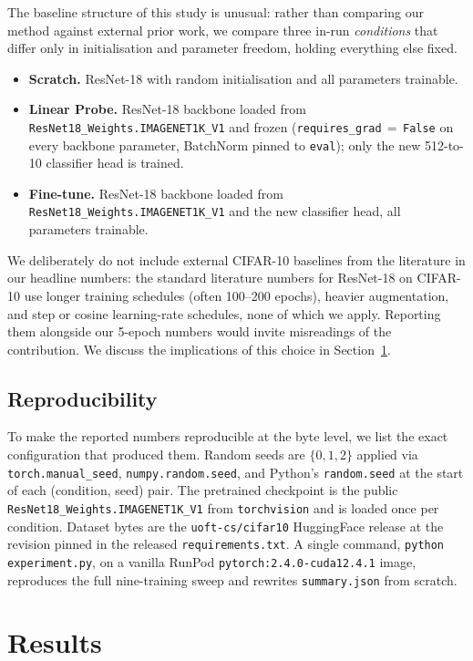 \documentclass[11pt,twocolumn]{article}
\begin{document}
The baseline structure of this study is unusual: rather than
comparing our method against external prior work, we compare three
in-run \emph{conditions} that differ only in initialisation and
parameter freedom, holding everything else fixed.
%
\begin{itemize}
  \item \textbf{Scratch.} ResNet-18 with random initialisation and
    all parameters trainable.
  \item \textbf{Linear Probe.} ResNet-18 backbone loaded from
    \texttt{ResNet18\_Weights.IMAGENET1K\_V1} and frozen
    (\texttt{requires\_grad}\,$=$\,\texttt{False} on every backbone
    parameter, BatchNorm pinned to \texttt{eval}); only the new
    512-to-10 classifier head is trained.
  \item \textbf{Fine-tune.} ResNet-18 backbone loaded from
    \texttt{ResNet18\_Weights.IMAGENET1K\_V1} and the new classifier
    head, all parameters trainable.
\end{itemize}
%
We deliberately do not include external CIFAR-10 baselines from the
literature in our headline numbers: the standard literature numbers
for ResNet-18 on CIFAR-10 use longer training schedules (often
100--200 epochs), heavier augmentation, and step or cosine
learning-rate schedules, none of which we apply. Reporting them
alongside our 5-epoch numbers would invite misreadings of the
contribution. We discuss the implications of this choice in
Section~\ref{sec:results}.


\subsection{Reproducibility}

To make the reported numbers reproducible at the byte level, we list
the exact configuration that produced them. Random seeds are
$\{0, 1, 2\}$ applied via \texttt{torch.manual\_seed}, \texttt{numpy.random.seed},
and Python's \texttt{random.seed} at the start of each (condition, seed)
pair. The pretrained checkpoint is the public
\texttt{ResNet18\_Weights.IMAGENET1K\_V1} from \texttt{torchvision} and is
loaded once per condition. Dataset bytes are the
\texttt{uoft-cs/cifar10} HuggingFace release at the revision pinned in
the released \texttt{requirements.txt}. A single command,
\texttt{python experiment.py}, on a vanilla RunPod \texttt{pytorch:2.4.0-cuda12.4.1}
image, reproduces the full nine-training sweep and rewrites
\texttt{summary.json} from scratch.


\section{Results}
\label{sec:results}
\end{document}
